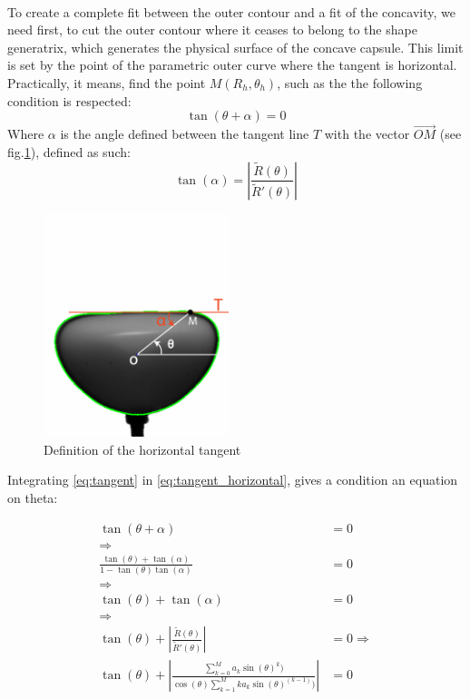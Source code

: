 \paragraph{}
To create a complete fit between the outer contour and a fit of the concavity, we need first, to cut the outer contour where it ceases to belong to the shape generatrix, which generates the physical surface of the concave capsule. This limit is set by the point of the parametric outer curve where the tangent is horizontal.
Practically, it means, find the point $M(R_{h},\theta_h)$, such as the the following condition is respected:
\begin{equation}
	\tan(\theta+\alpha) =0
	\label{eq:tangent_horizontal}
\end{equation}
Where $\alpha$ is the angle defined between the tangent line $T$ with the vector $\vec{OM}$ (see fig.\ref{fig:Illustration_tangent}), defined as such:
\begin{equation}
	\tan(\alpha) =|{\frac {\tilde{R}(\theta )}{\tilde{R}'(\theta )}}|
	\label{eq:tangent}
\end{equation}
\begin{figure}[H] %
	\centering%
  \includegraphics[width=0.48\textwidth]{figures/Chapter_1/tan_alpha.png}
	\caption{Definition of the horizontal tangent}
	\label{fig:Illustration_tangent}
\end{figure}
Integrating \eqref{eq:tangent} in \eqref{eq:tangent_horizontal}, gives a condition an equation on theta:
\begin{center}
	\begin{align*}
		\tan(\theta+\alpha) &=0\\
		\Rightarrow\\
		\frac{\tan(\theta)+\tan(\alpha)}{1-\tan(\theta)\tan(\alpha)} &= 0\\
		\Rightarrow\\
		\tan(\theta)+\tan(\alpha) &= 0\\
		\Rightarrow\\
		\tan(\theta)+|{\frac {\tilde{R}(\theta )}{\tilde{R}'(\theta )}}|&=0
		\Rightarrow\\
		\tan(\theta)+|{\frac {\sum\limits_{k=0}^M a_k \sin(\theta)^k  )}{\cos(\theta) \sum\limits_{k=1}^M k a_k \sin(\theta)^(k-1) )}}|&=0
	\end{align*}
\end{center}
